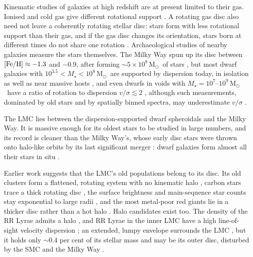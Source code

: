 \documentclass[fleqn,usenatbib,letters]{mnras}
\newcommand{\feh}{[{\rm Fe/H}]}
\newcommand{\Msun}{\,M$_\odot$}
\begin{document}
Kinematic studies of galaxies at high redshift are at present limited
to their gas.
Ionised and cold gas give different rotational support
\citep{Simons2016,Rizzo2020,Girard2021,deGraaff2024,Rizzo2024,Rowland2024,Kohandel2024,Danhaive2025}.
A rotating gas disc also need not leave a coherently rotating stellar
disc: stars form with less rotational support than their gas, and if
the gas disc changes its orientation, stars born at different times do
not share one rotation \citep{ElBadry2018,Zeng2024,Kohandel2025}.
Archaeological studies of nearby galaxies measure the stars
themselves. The Milky Way spun up its disc between $\feh\approx-1.3$
and $-0.9$, after forming $\sim5\times10^8$\Msun\ of stars
\citep[][see also \citealt{Conroy2022,Xiang2022,Rix2022}]{Belokurov2022,Belokurov2023,Kurbatov2024},
but most dwarf galaxies with
$10^{3.5}<M_\star<10^{8}$\Msun\ are supported by dispersion today, in isolation
as well as near massive hosts \citep{Wheeler2017}, and even dwarfs in voids
with $M_\star=10^7$--$10^9$\Msun\ have a ratio of rotation to
dispersion $v/\sigma\lesssim2$ \citep{delosReyes2023}, although such
measurements, dominated by old stars and by spatially binned spectra,
may underestimate $v/\sigma$ \citep{Ruan2026}.

The LMC lies between the dispersion-supported dwarf spheroidals and the
Milky Way. It is massive enough for its oldest stars to be studied in
large numbers, and its record is cleaner than the Milky Way's, whose
early disc stars were thrown onto halo-like orbits by its last significant
merger \citep{Bonaca2017,DiMatteo2019,Gallart2019,Belokurov2020}: dwarf galaxies form almost all their
stars in situ \citep[][but see \citealt{Mucciarelli2021}]{Fitts2018}.

Earlier work suggests that the LMC's old populations belong to its
disc. Its old clusters form a flattened, rotating system with no
kinematic halo \citep{Freeman1983,Schommer1992}, carbon stars trace a
thick rotating disc \citep{vanderMarel2002}, the surface brightness and
main-sequence star counts stay exponential to large radii
\citep{Gallart2004,Saha2010}, and the most metal-poor red giants lie in
a thicker disc rather than a hot halo \citep{Carrera2011}. Halo
candidates exist too. The density of the RR Lyrae admits a halo
\citep{Kinman1991}, and RR Lyrae in the inner LMC have a high
line-of-sight velocity dispersion \citep{Minniti2003,Pejcha2009}; an
extended, lumpy envelope surrounds the LMC
\citep{Majewski2009,Belokurov2016,Belokurov2017,Navarrete2019}, but it
holds only $\sim$0.4 per cent of its stellar mass \citep{Nidever2019}
and may be its outer disc, disturbed by the SMC and the Milky Way
\citep{Mackey2016,Mackey2018,Cullinane2022a,Cullinane2022b,Navarrete2023}.
\end{document}
